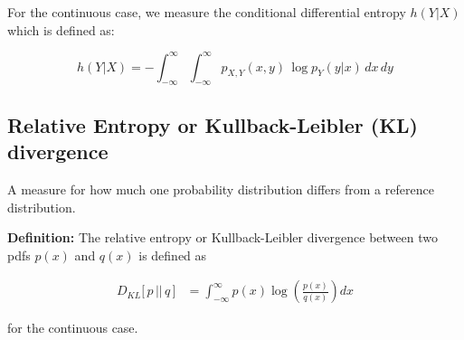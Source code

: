 \begin{frame}{\subsecname}

For the continuous case, we measure the conditional differential entropy $h(Y|X)$ which is defined as:

\begin{equation}
h(Y|X) = -\int_{-\infty}^{\infty} \int_{-\infty}^{\infty} p_{X,Y}(x,y)\,\log  p_{Y}(y|x) \, dx \, dy
\label{eq:diffentropycondcontinuous}
\end{equation}

\end{frame}

\subsection{Relative Entropy or Kullback-Leibler (KL) divergence}

\begin{frame}{\subsecname}

A measure for how much one probability distribution differs from a reference distribution. 

\textbf{Definition:} 
The relative entropy or Kullback-Leibler divergence between two pdfs $p(x)$ and $q(x)$ is defined as



\begin{align}
\label{eq:klcont}
D_{KL}\lbrack\,p\, ||\, q\,\rbrack 
&= \int_{-\infty}^{\infty} p(x) \log \left( \frac{p(x)}{q(x)} \right) dx
\end{align}

for the continuous case.

\end{frame}

